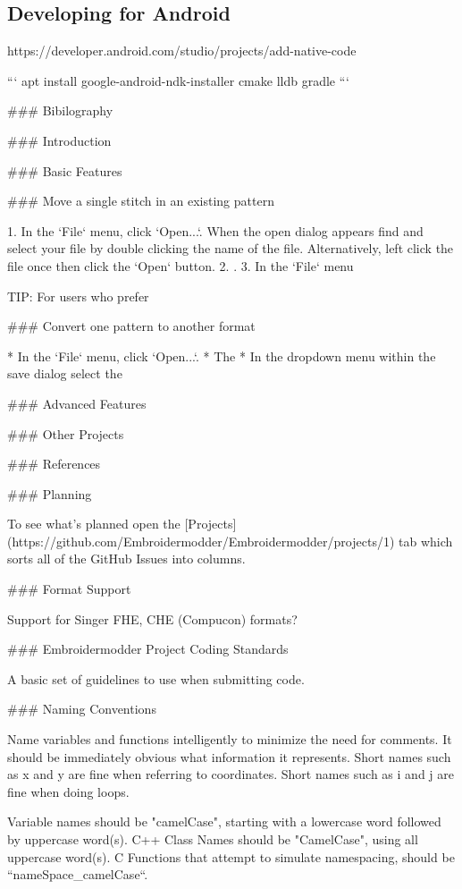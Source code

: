 \subsection{Developing for Android}

https://developer.android.com/studio/projects/add-native-code

```
apt install google-android-ndk-installer cmake lldb gradle
```

### Bibilography

### Introduction

### Basic Features

### Move a single stitch in an existing pattern

1. In the `File` menu, click `Open...`. When the open dialog appears find and select your file by double clicking the name of the file. Alternatively, left click the file once then click the `Open` button.
2. .
3. In the `File` menu

TIP: For users who prefer

### Convert one pattern to another format

* In the `File` menu, click `Open...`.
* The
* In the dropdown menu within the save dialog select the

### Advanced Features

### Other Projects

### References

### Planning

To see what's planned open the
[Projects](https://github.com/Embroidermodder/Embroidermodder/projects/1)
tab which sorts all of the GitHub Issues into columns.

### Format Support

Support for Singer FHE, CHE (Compucon) formats?

### Embroidermodder Project Coding Standards

A basic set of guidelines to use when submitting code.

### Naming Conventions

Name variables and functions intelligently to minimize the need for
comments. It should be immediately obvious what information it
represents. Short names such as x and y are fine when referring to
coordinates. Short names such as i and j are fine when doing loops.

Variable names should be "camelCase", starting with a lowercase word
followed by uppercase word(s). C++ Class Names should be "CamelCase",
using all uppercase word(s). C Functions that attempt to simulate namespacing,
should be ``nameSpace\_camelCase``.

